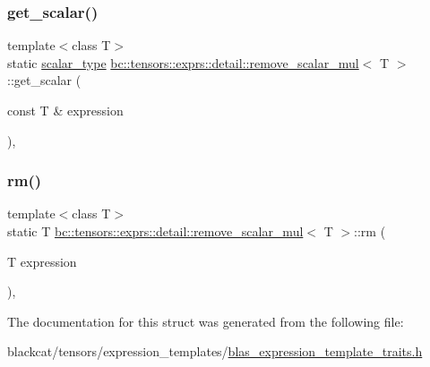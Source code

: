 \subsubsection{\texorpdfstring{get\+\_\+scalar()}{get\_scalar()}}
{\footnotesize\ttfamily template$<$class T$>$ \\
static \hyperlink{structbc_1_1tensors_1_1exprs_1_1detail_1_1remove__scalar__mul_a9732e37c5848f3501c4f715c537e3a0f}{scalar\+\_\+type} \hyperlink{structbc_1_1tensors_1_1exprs_1_1detail_1_1remove__scalar__mul}{bc\+::tensors\+::exprs\+::detail\+::remove\+\_\+scalar\+\_\+mul}$<$ T $>$\+::get\+\_\+scalar (\begin{DoxyParamCaption}\item[{const T \&}]{expression }\end{DoxyParamCaption})\hspace{0.3cm}{\ttfamily [inline]}, {\ttfamily [static]}}

\mbox{\label{structbc_1_1tensors_1_1exprs_1_1detail_1_1remove__scalar__mul_af6151fcaf6bbfa11139fbe8a978af01a}} 
\subsubsection{\texorpdfstring{rm()}{rm()}}
{\footnotesize\ttfamily template$<$class T$>$ \\
static T \hyperlink{structbc_1_1tensors_1_1exprs_1_1detail_1_1remove__scalar__mul}{bc\+::tensors\+::exprs\+::detail\+::remove\+\_\+scalar\+\_\+mul}$<$ T $>$\+::rm (\begin{DoxyParamCaption}\item[{T}]{expression }\end{DoxyParamCaption})\hspace{0.3cm}{\ttfamily [inline]}, {\ttfamily [static]}}



The documentation for this struct was generated from the following file\+:\begin{DoxyCompactItemize}
\item 
blackcat/tensors/expression\+\_\+templates/\hyperlink{blas__expression__template__traits_8h}{blas\+\_\+expression\+\_\+template\+\_\+traits.\+h}\end{DoxyCompactItemize}
